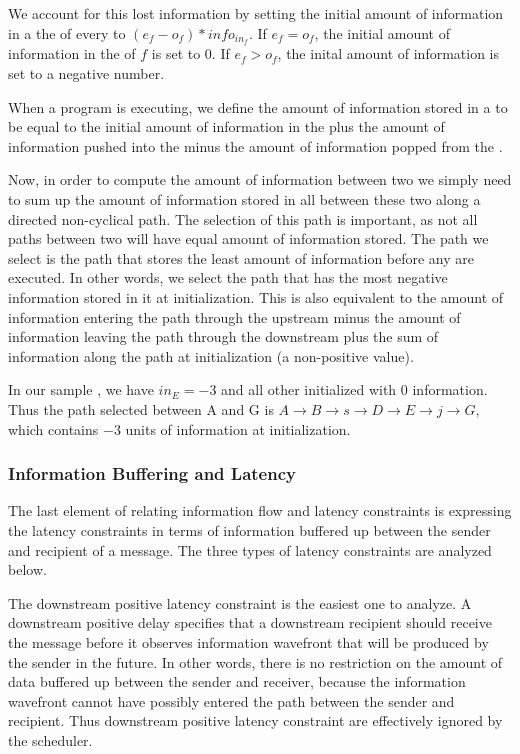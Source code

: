 We account for this lost information by setting the initial amount
of information in a the {\Input} {\Channel} of every {\filter} to $(e_f
- o_f) * info_{in_f}$.  If $e_f = o_f$, the initial amount of
information in the {\Input} {\Channel} of $f$ is set to 0. If $e_f >
o_f$, the inital amount of information is set to a negative
number.

When a {\StreamIt} program is executing, we define the amount of
information stored in a {\Channel} to be equal to the initial amount
of information in the {\Channel} plus the amount of information
pushed into the {\Channel} minus the amount of information popped
from the {\Channel}.

Now, in order to compute the amount of information between two
{\filters} we simply need to sum up the amount of information stored
in all {\Channels} between these two {\filters} along a directed
non-cyclical path.  The selection of this path is important, as
not all paths between two {\filters} will have equal amount of
information stored.  The path we select is the path that stores
the least amount of information before any {\filters} are executed.
In other words, we select the path that has the most negative
information stored in it at initialization.  This is also
equivalent to the amount of information entering the path through
the upstream {\filter} minus the amount of information leaving the
path through the downstream {\filter} plus the sum of information
along the path at initialization (a non-positive value).

In our sample {\pipeline}, we have $in_E = -3$ and all other
{\Channels} initialized with 0 information. Thus the path selected
between {\filters} A and G is $A \to B \to s \to D \to E \to j \to
G$, which contains $-3$ units of information at initialization.

\subsubsection{Information Buffering and Latency}

The last element of relating information flow and latency
constraints is expressing the latency constraints in terms of
information buffered up between the sender and recipient of a
message. The three types of latency constraints are analyzed
below.


The downstream positive latency constraint is the easiest one to
analyze. A downstream positive delay specifies that a downstream
recipient should receive the message before it observes
information wavefront that will be produced by the sender in the
future.  In other words, there is no restriction on the amount of
data buffered up between the sender and receiver, because the
information wavefront cannot have possibly entered the path
between the sender and recipient. Thus downstream positive latency
constraint are effectively ignored by the scheduler.

